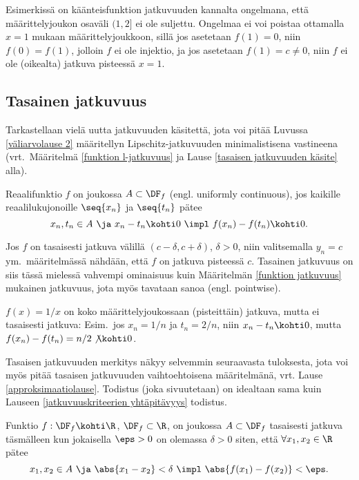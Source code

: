 Esimerkissä on käänteisfunktion jatkuvuuden kannalta ongelmana, että määrittelyjoukon osaväli 
$(1,2]$ ei ole suljettu. Ongelmaa ei voi poistaa ottamalla $x=1$ mukaan määrittelyjoukkoon,
sillä jos asetetaan $f(1)=0$, niin $f(0)=f(1)$, jolloin $f$ ei ole injektio, ja jos asetetaan 
$f(1)=c \neq 0$, niin $f$ ei ole (oikealta) jatkuva pisteessä $x=1$.

\subsection*{Tasainen jatkuvuus}
 

Tarkastellaan vielä uutta jatkuvuuden käsitettä, jota voi pitää Luvussa 
\ref{väliarvolause 2} määritellyn Lipschitz-jatkuvuuden minimalistisena vastineena 
(vrt.\ Määritelmä \ref{funktion l-jatkuvuus} ja Lause \ref{tasaisen jatkuvuuden käsite} alla).
\begin{Def} Reaalifunktio $f$ on joukossa $A\subset\DF_f$  
(engl. uniformly continuous), jos kaikille reaalilukujonoille $\seq{x_n}$ ja $\seq{t_n}$ pätee
\[
x_n,t_n\in A \ \ja \ x_n-t_n\kohti 0 \ \impl \ f(x_n)-f(t_n)\kohti 0.
\]
\end{Def}
Jos $f$ on tasaisesti jatkuva välillä $(c-\delta,c+\delta)$, $\delta>0$, niin valitsemalla 
$y_n=c$ ym.\ määritelmässä nähdään, että $f$ on jatkuva pisteessä $c$. Tasainen jatkuvuus 
on siis tässä mielessä vahvempi ominaisuus kuin Määritelmän \ref{funktion jatkuvuus} mukainen
%
jatkuvuus, jota myös tavataan sanoa  (engl. pointwise).
\begin{Exa}
$f(x)=1/x$ on koko määrittelyjoukossaan (pisteittäin) jatkuva, mutta ei tasaisesti jatkuva: 
Esim.\ jos $x_n=1/n$ ja $t_n=2/n$, niin $x_n-t_n \kohti 0$, mutta 
$f(x_n)-f(t_n) = n/2 \not\kohti 0$.
\end{Exa}
Tasaisen jatkuvuuden merkitys näkyy selvemmin seuraavasta tuloksesta, jota voi myös pitää 
tasaisen jatkuvuuden vaihtoehtoisena määritelmänä, vrt. Lause \ref{approksimaatiolause}.
Todistus (joka sivuutetaan) on idealtaan sama kuin Lauseen
\ref{jatkuvuuskriteerien yhtäpitävyys} todistus.
\begin{*Lause} \label{tasaisen jatkuvuuden käsite}
Funktio $f:\DF_f\kohti\R$, $\DF_f\subset\R$, on joukossa $A\subset\DF_f$ tasaisesti jatkuva 
täsmälleen kun jokaisella $\eps>0$ on olemassa $\delta>0$ siten, että $\forall x_1,x_2\in\R$
pätee
\[
x_1,x_2\in A \ \ja \ \abs{x_1-x_2}<\delta \ \impl \ \abs{f(x_1)-f(x_2)}<\eps.
\]
\end{*Lause}
